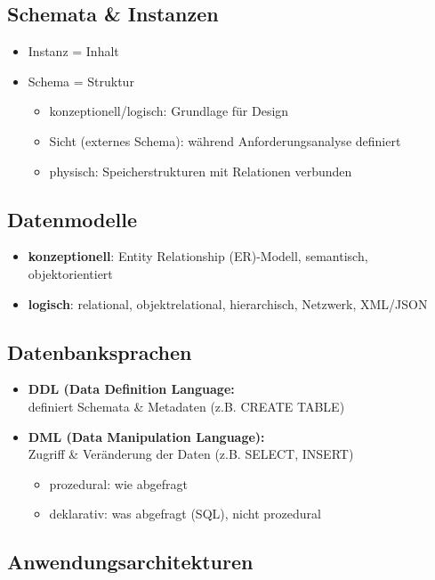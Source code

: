 \documentclass[12pt,a4paper]{article}
\begin{document}
\subsection{Schemata \& Instanzen}

\begin{itemize}
\item Instanz = Inhalt
\item Schema = Struktur
\begin{itemize}
\item konzeptionell/logisch: Grundlage für Design
\item Sicht (externes Schema): während Anforderungsanalyse definiert
\item physisch: Speicherstrukturen mit Relationen verbunden
\end{itemize}
\end{itemize}

\subsection{Datenmodelle}

\begin{itemize}
\item \textbf{konzeptionell}: Entity Relationship (ER)-Modell, semantisch, objektorientiert
\item \textbf{logisch}: relational, objektrelational, hierarchisch, Netzwerk, XML/JSON
\end{itemize}

\subsection{Datenbanksprachen}

\begin{itemize}
\item \textbf{DDL (Data Definition Language:} \\
definiert Schemata \& Metadaten (z.B. CREATE TABLE)
\item \textbf{DML (Data Manipulation Language):} \\
Zugriff \& Veränderung der Daten (z.B. SELECT, INSERT)
\begin{itemize}
\item prozedural: wie abgefragt
\item deklarativ: was abgefragt (SQL), nicht prozedural
\end{itemize}
\end{itemize}

\subsection{Anwendungsarchitekturen}
\end{document}
